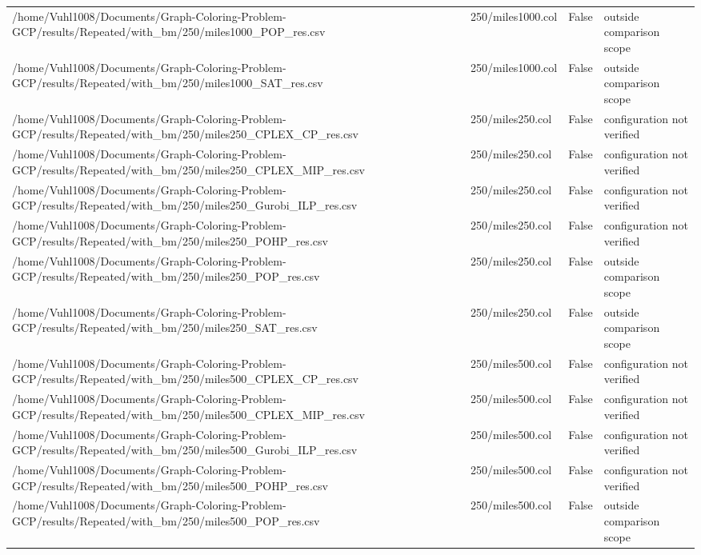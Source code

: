 \begin{table}[htbp]
\begin{tabular}{llll}
/home/Vuhl1008/Documents/Graph-Coloring-Problem-GCP/results/Repeated/with\_bm/250/miles1000\_POP\_res.csv & 250/miles1000.col & False & outside comparison scope \\
/home/Vuhl1008/Documents/Graph-Coloring-Problem-GCP/results/Repeated/with\_bm/250/miles1000\_SAT\_res.csv & 250/miles1000.col & False & outside comparison scope \\
/home/Vuhl1008/Documents/Graph-Coloring-Problem-GCP/results/Repeated/with\_bm/250/miles250\_CPLEX\_CP\_res.csv & 250/miles250.col & False & configuration not verified \\
/home/Vuhl1008/Documents/Graph-Coloring-Problem-GCP/results/Repeated/with\_bm/250/miles250\_CPLEX\_MIP\_res.csv & 250/miles250.col & False & configuration not verified \\
/home/Vuhl1008/Documents/Graph-Coloring-Problem-GCP/results/Repeated/with\_bm/250/miles250\_Gurobi\_ILP\_res.csv & 250/miles250.col & False & configuration not verified \\
/home/Vuhl1008/Documents/Graph-Coloring-Problem-GCP/results/Repeated/with\_bm/250/miles250\_POHP\_res.csv & 250/miles250.col & False & configuration not verified \\
/home/Vuhl1008/Documents/Graph-Coloring-Problem-GCP/results/Repeated/with\_bm/250/miles250\_POP\_res.csv & 250/miles250.col & False & outside comparison scope \\
/home/Vuhl1008/Documents/Graph-Coloring-Problem-GCP/results/Repeated/with\_bm/250/miles250\_SAT\_res.csv & 250/miles250.col & False & outside comparison scope \\
/home/Vuhl1008/Documents/Graph-Coloring-Problem-GCP/results/Repeated/with\_bm/250/miles500\_CPLEX\_CP\_res.csv & 250/miles500.col & False & configuration not verified \\
/home/Vuhl1008/Documents/Graph-Coloring-Problem-GCP/results/Repeated/with\_bm/250/miles500\_CPLEX\_MIP\_res.csv & 250/miles500.col & False & configuration not verified \\
/home/Vuhl1008/Documents/Graph-Coloring-Problem-GCP/results/Repeated/with\_bm/250/miles500\_Gurobi\_ILP\_res.csv & 250/miles500.col & False & configuration not verified \\
/home/Vuhl1008/Documents/Graph-Coloring-Problem-GCP/results/Repeated/with\_bm/250/miles500\_POHP\_res.csv & 250/miles500.col & False & configuration not verified \\
/home/Vuhl1008/Documents/Graph-Coloring-Problem-GCP/results/Repeated/with\_bm/250/miles500\_POP\_res.csv & 250/miles500.col & False & outside comparison scope \\

\end{tabular}
\end{table}
